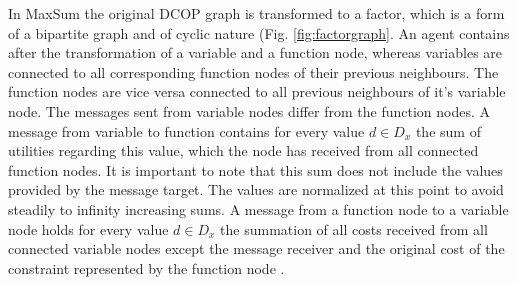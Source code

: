 In MaxSum the original DCOP graph is transformed to a factor, which is a form of a bipartite graph and of cyclic nature (Fig. \ref{fig:factorgraph}. An agent contains after the transformation of a variable and a function node, whereas variables are connected to all corresponding function nodes of  their previous neighbours. The function nodes are vice versa connected to all previous neighbours of it's variable node. 
The messages sent from variable nodes differ from the function nodes. A message from variable to function contains for every value \(d \in D_{x}\) the sum of utilities regarding this value, which the node has received from all connected function nodes. It is important to note that this sum does not include the values provided by the message target. The values are normalized at this point to avoid steadily to infinity increasing sums. A message from a function node to a variable node holds for every value  \(d \in D_{x}\)  the summation of all costs received from all connected variable nodes except the message receiver and the original cost of the constraint represented by the function node \cite{Zivan2012}.


    
    